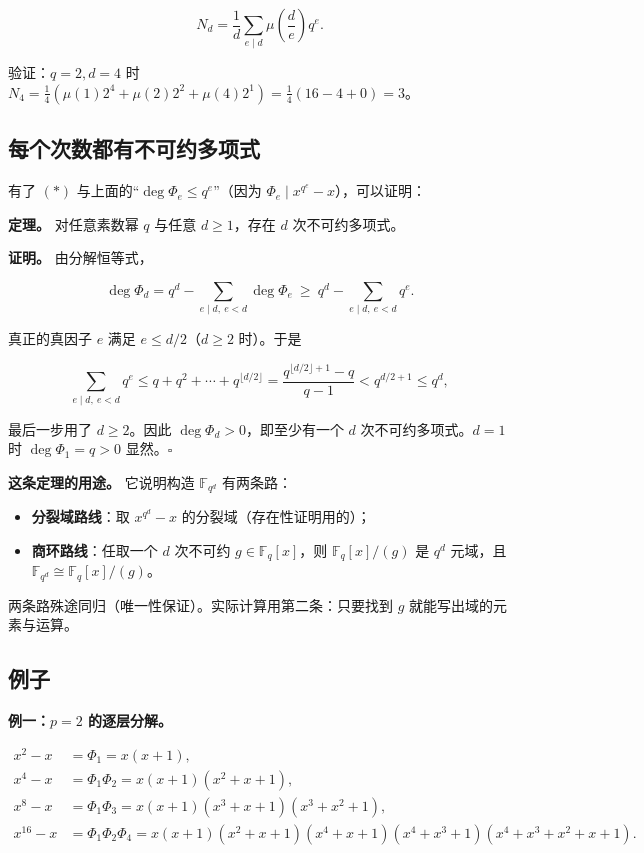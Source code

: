 \[
N_d=\frac1d\sum_{e\mid d}\mu\!\left(\frac de\right)q^e .
\]

验证：$q=2,d=4$ 时 $N_4=\frac14(\mu(1)2^4+\mu(2)2^2+\mu(4)2^1)=\frac14(16-4+0)=3$。

\subsection{每个次数都有不可约多项式}


有了 $(\ast)$ 与上面的“$\deg\Phi_e\le q^e$”（因为 $\Phi_e\mid x^{q^e}-x$），可以证明：

\textbf{定理。} 对任意素数幂 $q$ 与任意 $d\ge1$，存在 $d$ 次不可约多项式。

\textbf{证明。} 由分解恒等式，

\[
\deg\Phi_d=q^d-\sum_{e\mid d,\ e<d}\deg\Phi_e
\ \ge\ q^d-\sum_{e\mid d,\ e<d}q^e .
\]

真正的真因子 $e$ 满足 $e\le d/2$（$d\ge2$ 时）。于是

\[
\sum_{e\mid d,\ e<d}q^e
\le q+q^2+\cdots+q^{\lfloor d/2\rfloor}
=\frac{q^{\lfloor d/2\rfloor+1}-q}{q-1}
<q^{d/2+1}
\le q^d,
\]

最后一步用了 $d\ge2$。因此 $\deg\Phi_d>0$，即至少有一个 $d$ 次不可约多项式。$d=1$ 时 $\deg\Phi_1=q>0$ 显然。$\square$

\textbf{这条定理的用途。} 它说明构造 $\mathbb F_{q^d}$ 有两条路：

\begin{itemize}
\item \textbf{分裂域路线}：取 $x^{q^d}-x$ 的分裂域（存在性证明用的）；
\item \textbf{商环路线}：任取一个 $d$ 次不可约 $g\in\mathbb F_q[x]$，则 $\mathbb F_q[x]/(g)$ 是 $q^d$ 元域，且 $\mathbb F_{q^d}\cong\mathbb F_q[x]/(g)$。
\end{itemize}


两条路殊途同归（唯一性保证）。实际计算用第二条：只要找到 $g$ 就能写出域的元素与运算。

\subsection{例子}


\textbf{例一：$p=2$ 的逐层分解。}

\[
\begin{aligned}
x^2-x&=\Phi_1=x(x+1),\\
x^4-x&=\Phi_1\Phi_2=x(x+1)(x^2+x+1),\\
x^8-x&=\Phi_1\Phi_3=x(x+1)(x^3+x+1)(x^3+x^2+1),\\
x^{16}-x&=\Phi_1\Phi_2\Phi_4=x(x+1)(x^2+x+1)(x^4+x+1)(x^4+x^3+1)(x^4+x^3+x^2+x+1).
\end{aligned}
\]

